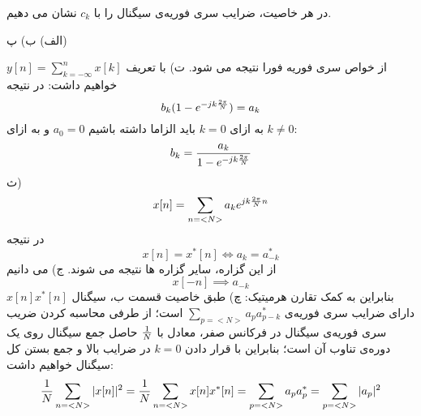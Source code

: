 \documentclass[10pt,letterpaper]{article}
\newcommand{\nl}{\newline\newline}
\begin{document}
در هر خاصیت، ضرایب سری فوریه‌ی سیگنال را با $c_k$ نشان می دهیم.

الف)
ب) 
پ)

از خواص سری فوریه فورا نتیجه می شود.
\nl
ت) با تعریف 
$
y[n]=\sum_{k=-\infty}^n x[k]
$
 خواهیم داشت:
در نتیجه
$$
b_k(1-e^{-jk{2\pi\over N}})=a_k
$$
به ازای $k=0$ باید الزاما داشته باشیم $
a_0=0
$
 و به ازای 
$
k\ne 0
$:
$$
b_k={a_k\over 1-e^{-jk{2\pi\over N}}}
$$
ث)
$$
x[n]=\sum_{n=<N>}a_ke^{jk{2\pi\over N}n}
$$
در نتیجه
$$
x[n]=x^*[n]\iff a_k=a^*_{-k}
$$
از این گزاره، سایر گزاره ها نتیجه می شوند.
\nl
ج) می دانیم
$$
x[-n]\implies a_{-k}
$$
بنابراین به کمک تقارن هرمیتیک:
\nl
چ) طبق خاصیت قسمت ب، سیگنال 
$
x[n]x^*[n]
$
 دارای ضرایب سری فوریه‌ی 
$
\sum_{p=<N>}a_pa^*_{p-k}
$
است؛ از طرفی محاسبه کردن ضریب سری فوریه‌ی سیگنال در فرکانس صفر، معادل با 
$
1\over N
$
 حاصل جمع سیگنال روی یک دوره‌ی تناوب آن است؛ بنابراین با قرار دادن $k=0$ در ضرایب بالا و جمع بستن کل سیگنال خواهیم داشت:
$$
{1\over N}\sum_{n=<N>}|x[n]|^2={1\over N}\sum_{n=<N>}x[n]x^*[n]
=\sum_{p=<N>}a_pa^*_{p}=\sum_{p=<N>}|a_p|^2
$$
\end{document}
